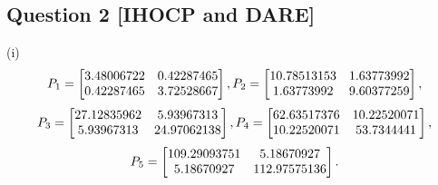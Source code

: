 \documentclass[a4paper,11pt,reqno]{amsart}
\begin{document}
\subsection*{Question 2 [IHOCP and DARE]}\label{sec:q2}
(i)
\begin{equation}
    P_1 =
    \begin{bmatrix}
        3.48006722 & 0.42287465 \\
        0.42287465 & 3.72528667
    \end{bmatrix}, 
    P_2 =
    \begin{bmatrix}
        10.78513153 & 1.63773992 \\
        1.63773992 & 9.60377259
    \end{bmatrix}, 
    \notag
\end{equation}
\begin{equation}
    P_3 =
    \begin{bmatrix}
        27.12835962 & 5.93967313 \\
        5.93967313 & 24.97062138
    \end{bmatrix}, 
    P_4 =
    \begin{bmatrix}
        62.63517376 & 10.22520071 \\
        10.22520071 & 53.7344441
    \end{bmatrix}, 
    \notag
\end{equation}
\begin{equation}
    P_5 =
    \begin{bmatrix}
        109.29093751 & 5.18670927 \\
        5.18670927 & 112.97575136
    \end{bmatrix}.
    \notag
\end{equation}
\end{document}
